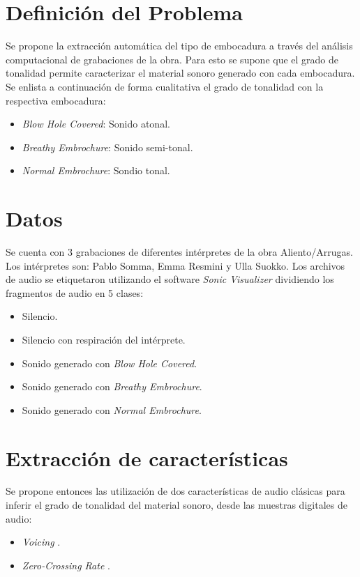 \documentclass{article}
\begin{document}
\section*{Definición del Problema}
Se propone la extracción automática del tipo de embocadura a través del análisis computacional de grabaciones de la obra. Para esto se supone que el grado de tonalidad permite caracterizar el material sonoro generado con cada embocadura. Se enlista a continuación de forma cualitativa el grado de tonalidad con la respectiva embocadura:

\begin{itemize} 
  \item \textit{Blow Hole Covered}: Sonido atonal.
  \item \textit{Breathy Embrochure}: Sonido semi-tonal. 
  \item \textit{Normal Embrochure}: Sondio tonal.
\end{itemize}


\section*{Datos}
Se cuenta con 3 grabaciones de diferentes intérpretes de la obra Aliento/Arrugas. Los intérpretes son: Pablo Somma, Emma Resmini y Ulla Suokko. Los archivos de audio se etiquetaron utilizando el software \textit{Sonic Visualizer} dividiendo los fragmentos de audio en 5 clases:

\begin{itemize} 
  \item Silencio.
  \item Silencio con respiración del intérprete. 
  \item Sonido generado con \textit{Blow Hole Covered}.
  \item Sonido generado con \textit{Breathy Embrochure}.
  \item Sonido generado con \textit{Normal Embrochure}.
\end{itemize}
 

\section*{Extracción de características}
Se propone entonces las utilización de dos características de audio clásicas para inferir el grado de tonalidad del material sonoro, desde las muestras digitales de audio: 

\begin{itemize} 
  \item \textit{Voicing} \cite[Chapter~12]{klapuri2007signal}.
  \item \textit{Zero-Crossing Rate} \cite[Chapter~4]{rabiner1978digital}. 
\end{itemize}
\medskip
\end{document}
